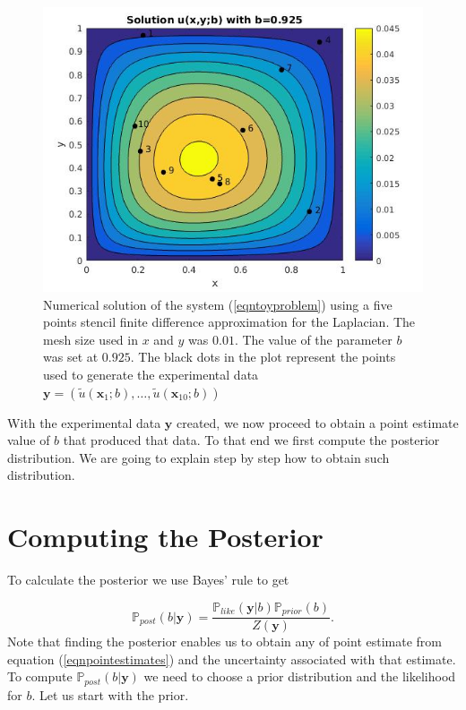 \documentclass[12pt]{book}
\newcommand{\post}{\mathbb{P}_{post}}
\newcommand{\like}{\mathbb{P}_{like}}
\newcommand{\prior}{\mathbb{P}_{prior}}
\newcommand{\x}{\textbf{x}}
\newcommand{\y}{\textbf{y}}
\begin{document}
\begin{figure}[H]
\centering
\includegraphics[scale=0.5]{./FigChap3/solu}
\caption{Numerical solution of the system (\ref{eqntoyproblem}) using a five points stencil finite difference
approximation for the Laplacian. The mesh
size used in $x$ and $y$ was $0.01$. The value of the parameter $b$ was set at $0.925$. The black dots
in the plot represent the points used to generate the experimental data 
$\y=(\tilde{u}(\x_{1};b),\ldots,\tilde{u}(\x_{10};b))$}
\label{figsolU}
\end{figure}

With the experimental data $\y$ created, we now proceed to obtain a point estimate value of $b$ that produced that data. 
To that end
we first compute the posterior distribution. We are going to explain step by step how to obtain such distribution.

\section{Computing the Posterior}
To calculate the posterior we use Bayes' rule to get

\begin{equation} \label{eqnpropto}
\post(b|\y)=\frac{\like(\y|b)\prior(b)}{Z(\y)}.
\end{equation}
Note that finding the posterior enables us to obtain   any of point
estimate from equation (\ref{eqnpointestimates}) and the uncertainty associated with that estimate.
To compute $\post(b|\y)$ we need to choose
a prior distribution and the likelihood for $b$. Let us start with the prior. 
\end{document}
